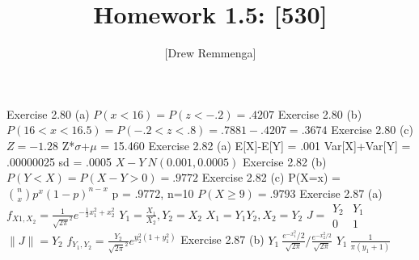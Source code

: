 \documentclass[10pt, oneside]{article}
\title{Homework 1.5: [530]}
\author{[Drew Remmenga]}
\begin{document}
\maketitle
\pagebreak
Exercise 2.80 (a)
$P(x<16)=P(z<-.2)=.4207$
\clearpage
Exercise 2.80 (b)
$P(16<x<16.5)=P(-.2<z<.8) = .7881-.4207=.3674$
\clearpage
Exercise 2.80 (c)
$Z=-1.28$
Z*$\sigma$+$\mu$ = 15.460
\clearpage
Exercise 2.82 (a)
E[X]-E[Y] = .001
Var[X]+Var[Y] = .00000025
sd = .0005
$X-Y ~ N(0.001,0.0005)$
\clearpage
Exercise 2.82 (b)
$P(Y<X) = P(X-Y>0) =.9772$
\clearpage
Exercise 2.82 (c)
P(X=x) = ${n \choose x} p^{x} (1-p)^{n-x}$ p = .9772, n=10
$P(X\geq 9) = .9793$
\clearpage
Exercise 2.87 (a)
$f_{X{1},X_{2}} = \frac{1}{\sqrt{2\pi}^{2}}e^{-\frac{1}{2}x_{1}^{2}+x_{2}^{2}}$
$Y_{1}=\frac{X_{1}}{X_{2}}, Y_{2} = X_{2}$
$X_{1}=Y_{1}Y_{2}, X_{2} = Y_{2}$
$J = \begin{matrix} Y_{2} & Y_{1} \\
    0 & 1\end{matrix}$
$\|J \| =   Y_{2}$
$f_{Y_{1},Y_{2}}=\frac{Y_{2}}{\sqrt{2\pi}^{2}}e^{y_{2}^{2}(1+y_{1}^{2})}$
\clearpage
Exercise 2.87 (b)
$Y_{1} ~ \frac{e^{-x_{1}^{2}}/2}{\sqrt{2\pi}}/\frac{e^{-x_{2}^{2}/2}}{\sqrt{2\pi}}$
$Y_{1} ~ \frac{1}{\pi(y_{1}+1)}$
\end{document}
